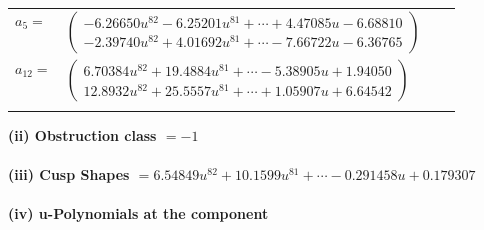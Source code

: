 \documentclass[1p]{elsarticle_modified}
\theoremstyle{definition}
\begin{document}
\begin{tabular}{m{7pt} m{180pt} m{7pt} m{180pt} }
\flushright $a_{5}=$&$\begin{pmatrix}-6.26650 u^{82}-6.25201 u^{81}+\cdots+4.47085 u-6.68810\\-2.39740 u^{82}+4.01692 u^{81}+\cdots-7.66722 u-6.36765\end{pmatrix}$ \\
\flushright $a_{12}=$&$\begin{pmatrix}6.70384 u^{82}+19.4884 u^{81}+\cdots-5.38905 u+1.94050\\12.8932 u^{82}+25.5557 u^{81}+\cdots+1.05907 u+6.64542\end{pmatrix}$\\&\end{tabular}
\flushleft \textbf{(ii) Obstruction class $= -1$}\\~\\
\flushleft \textbf{(iii) Cusp Shapes $= 6.54849 u^{82}+10.1599 u^{81}+\cdots-0.291458 u+0.179307$}\\~\\
\newpage\renewcommand{\arraystretch}{1}
\flushleft \textbf{(iv) u-Polynomials at the component}\newline \\
\end{document}
